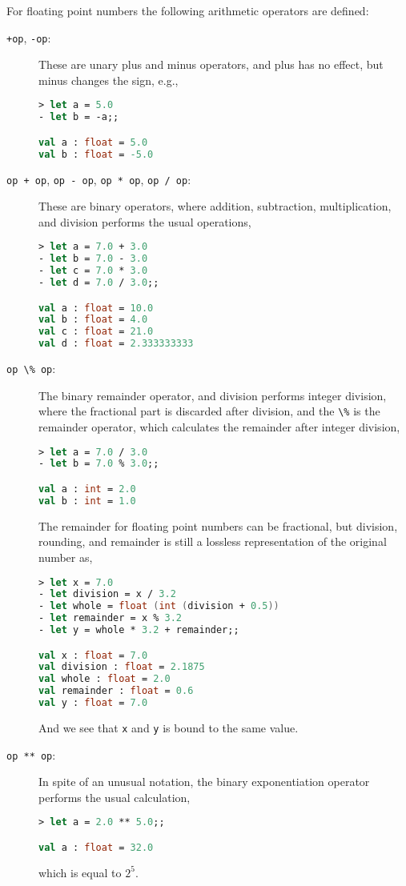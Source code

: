 For floating point numbers the following arithmetic operators are defined: 
\begin{description}
\item[\texttt{+op}, \texttt{-op}:] These are unary plus and minus operators, and plus has no effect, but minus changes the sign, e.g.,
\begin{lstlisting}[language=fsharp,caption={fsharpi}]
> let a = 5.0 
- let b = -a;;

val a : float = 5.0
val b : float = -5.0
\end{lstlisting}
\item[\lstinline|op + op|, \lstinline|op - op|, \lstinline|op * op|, \lstinline|op / op|:] These are binary operators, where addition, subtraction, multiplication, and division performs the usual operations, 
\begin{lstlisting}[language=fsharp,caption={fsharpi}]
> let a = 7.0 + 3.0
- let b = 7.0 - 3.0
- let c = 7.0 * 3.0
- let d = 7.0 / 3.0;;

val a : float = 10.0
val b : float = 4.0
val c : float = 21.0
val d : float = 2.333333333
\end{lstlisting}
\item[\lstinline|op \% op|:] The binary remainder operator, and division performs integer division, where the fractional part is discarded after division, and the \lstinline|\%| is the remainder operator, which calculates the remainder after integer division,
\begin{lstlisting}[language=fsharp,caption={fsharpi}]
> let a = 7.0 / 3.0
- let b = 7.0 % 3.0;;

val a : int = 2.0
val b : int = 1.0
\end{lstlisting}
The remainder for floating point numbers can be fractional, but division, rounding, and remainder is still a lossless representation of the original number as,
\begin{lstlisting}[language=fsharp,caption={fsharpi}]
> let x = 7.0
- let division = x / 3.2
- let whole = float (int (division + 0.5))
- let remainder = x % 3.2
- let y = whole * 3.2 + remainder;;

val x : float = 7.0
val division : float = 2.1875
val whole : float = 2.0
val remainder : float = 0.6
val y : float = 7.0
\end{lstlisting}
And we see that \lstinline|x| and \lstinline|y| is bound to the same value.  
\item[\texttt{op ** op}:] In spite of an unusual notation, the binary exponentiation operator performs the usual calculation,
\begin{lstlisting}[language=fsharp,caption={fsharpi}]
> let a = 2.0 ** 5.0;;

val a : float = 32.0
\end{lstlisting}
which is equal to $2^5$.
\end{description}


